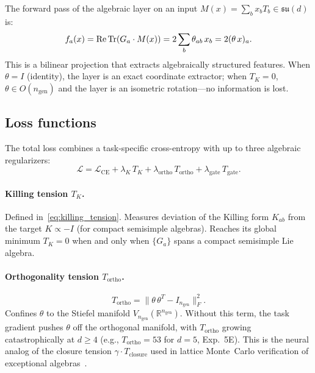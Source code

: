 \documentclass[11pt,a4paper]{article}
\newcommand{\fksu}{\mathfrak{su}}
\newcommand{\RR}{\mathbb{R}}
\newcommand{\TK}{T_K}
\newcommand{\Tortho}{T_{\mathrm{ortho}}}
\newcommand{\Tclosure}{T_{\mathrm{closure}}}
\newcommand{\Tgate}{T_{\mathrm{gate}}}
\newcommand{\ngen}{n_{\mathrm{gen}}}
\theoremstyle{definition}
\begin{document}
The forward pass of the algebraic layer on an input 
$M(x) = \sum_b x_b T_b \in \fksu(d)$ is:
\begin{equation}
  \label{eq:forward}
  f_a(x) = \operatorname{Re}\Tr(G_a \cdot M(x)) 
  = 2 \sum_b \theta_{ab}\, x_b = 2(\theta\, x)_a.
\end{equation}
This is a bilinear projection that extracts algebraically structured 
features. When $\theta = I$ (identity), the layer is an exact coordinate 
extractor; when $\TK = 0$, $\theta \in O(\ngen)$ and the layer is an 
isometric rotation---no information is lost.

\subsection{Loss functions}
\label{sec:losses}

The total loss combines a task-specific cross-entropy with up to three 
algebraic regularizers:
\begin{equation}
  \label{eq:total_loss}
  \mathcal{L} = \mathcal{L}_{\mathrm{CE}} 
  + \lambda_K\, \TK 
  + \lambda_{\mathrm{ortho}}\, \Tortho 
  + \lambda_{\mathrm{gate}}\, \Tgate.
\end{equation}

\paragraph{Killing tension $\TK$.}
Defined in~\eqref{eq:killing_tension}. Measures deviation of the Killing 
form $K_{ab}$ from the target $K \propto -I$ (for compact semisimple 
algebras). Reaches its global minimum $\TK = 0$ when and only when 
$\{G_a\}$ spans a compact semisimple Lie algebra.

\paragraph{Orthogonality tension $\Tortho$.}
\begin{equation}
  \Tortho = \|\theta\,\theta^T - I_{\ngen}\|_F^2.
\end{equation}
Confines $\theta$ to the Stiefel manifold $V_{\ngen}(\RR^{\ngen})$. 
Without this term, the task gradient pushes $\theta$ off the orthogonal 
manifold, with $\Tortho$ growing catastrophically at $d \geq 4$ 
(e.g., $\Tortho = 53$ for $d = 5$, Exp.~5E). This is the neural analog 
of the closure tension $\gamma \cdot \Tclosure$ used in lattice 
Monte~Carlo verification of exceptional algebras~\cite{moreno2026experimental}.
\end{document}

